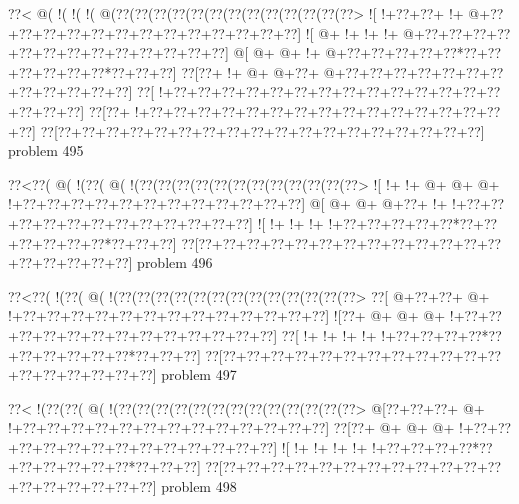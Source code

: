 \vbox{\vbox{\goo
\0??<\- @(\- !(\- !(\- !(\- @(\0??(\0??(\0??(\0??(\0??(\0??(\0??(\0??(\0??(\0??(\0??(\0??(\0??>
\- ![\- !+\0??+\0??+\- !+\- @+\0??+\0??+\0??+\0??+\0??+\0??+\0??+\0??+\0??+\0??+\0??+\0??+\0??]
\- ![\- @+\- !+\- !+\- !+\- @+\0??+\0??+\0??+\0??+\0??+\0??+\0??+\0??+\0??+\0??+\0??+\0??+\0??]
\- @[\- @+\- @+\- !+\- @+\0??+\0??+\0??+\0??+\0??*\0??+\0??+\0??+\0??+\0??+\0??*\0??+\0??+\0??]
\0??[\0??+\- !+\- @+\- @+\0??+\- @+\0??+\0??+\0??+\0??+\0??+\0??+\0??+\0??+\0??+\0??+\0??+\0??]
\0??[\- !+\0??+\0??+\0??+\0??+\0??+\0??+\0??+\0??+\0??+\0??+\0??+\0??+\0??+\0??+\0??+\0??+\0??]
\0??[\0??+\- !+\0??+\0??+\0??+\0??+\0??+\0??+\0??+\0??+\0??+\0??+\0??+\0??+\0??+\0??+\0??+\0??]
\0??[\0??+\0??+\0??+\0??+\0??+\0??+\0??+\0??+\0??+\0??+\0??+\0??+\0??+\0??+\0??+\0??+\0??+\0??]
}
\hfil problem 495\hfil\break
}



\vbox{\vbox{\goo
\0??<\0??(\- @(\- !(\0??(\- @(\- !(\0??(\0??(\0??(\0??(\0??(\0??(\0??(\0??(\0??(\0??(\0??(\0??>
\- ![\- !+\- !+\- @+\- @+\- @+\- !+\0??+\0??+\0??+\0??+\0??+\0??+\0??+\0??+\0??+\0??+\0??+\0??]
\- @[\- @+\- @+\- @+\0??+\- !+\- !+\0??+\0??+\0??+\0??+\0??+\0??+\0??+\0??+\0??+\0??+\0??+\0??]
\- ![\- !+\- !+\- !+\- !+\0??+\0??+\0??+\0??+\0??*\0??+\0??+\0??+\0??+\0??+\0??*\0??+\0??+\0??]
\0??[\0??+\0??+\0??+\0??+\0??+\0??+\0??+\0??+\0??+\0??+\0??+\0??+\0??+\0??+\0??+\0??+\0??+\0??]
}
\hfil problem 496\hfil\break
}



\vbox{\vbox{\goo
\0??<\0??(\- !(\0??(\- @(\- !(\0??(\0??(\0??(\0??(\0??(\0??(\0??(\0??(\0??(\0??(\0??(\0??(\0??>
\0??[\- @+\0??+\0??+\- @+\- !+\0??+\0??+\0??+\0??+\0??+\0??+\0??+\0??+\0??+\0??+\0??+\0??+\0??]
\- ![\0??+\- @+\- @+\- @+\- !+\0??+\0??+\0??+\0??+\0??+\0??+\0??+\0??+\0??+\0??+\0??+\0??+\0??]
\0??[\- !+\- !+\- !+\- !+\- !+\0??+\0??+\0??+\0??*\0??+\0??+\0??+\0??+\0??+\0??*\0??+\0??+\0??]
\0??[\0??+\0??+\0??+\0??+\0??+\0??+\0??+\0??+\0??+\0??+\0??+\0??+\0??+\0??+\0??+\0??+\0??+\0??]
}
\hfil problem 497\hfil\break
}



\vbox{\vbox{\goo
\0??<\- !(\0??(\0??(\- @(\- !(\0??(\0??(\0??(\0??(\0??(\0??(\0??(\0??(\0??(\0??(\0??(\0??(\0??>
\- @[\0??+\0??+\0??+\- @+\- !+\0??+\0??+\0??+\0??+\0??+\0??+\0??+\0??+\0??+\0??+\0??+\0??+\0??]
\0??[\0??+\- @+\- @+\- @+\- !+\0??+\0??+\0??+\0??+\0??+\0??+\0??+\0??+\0??+\0??+\0??+\0??+\0??]
\- ![\- !+\- !+\- !+\- !+\- !+\0??+\0??+\0??+\0??*\0??+\0??+\0??+\0??+\0??+\0??*\0??+\0??+\0??]
\0??[\0??+\0??+\0??+\0??+\0??+\0??+\0??+\0??+\0??+\0??+\0??+\0??+\0??+\0??+\0??+\0??+\0??+\0??]
}
\hfil problem 498\hfil\break
}



